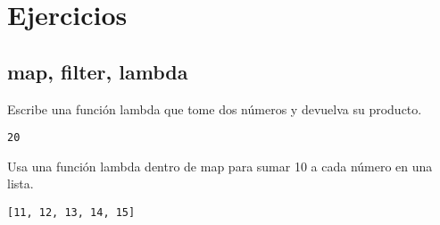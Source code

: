 \section{Ejercicios}

\subsection{map, filter, lambda}

\begin{exercise} 
Escribe una función lambda que tome dos números y devuelva su producto.
\begin{Shaded}
\begin{Highlighting}[]
\OperatorTok{=} \OperatorTok{*}
\NormalTok{, }\NormalTok{))}
\end{Highlighting}
\end{Shaded}

\begin{verbatim}
20

\end{verbatim}
\end{exercise}

\begin{exercise}
Usa una función lambda dentro de map para sumar 10 a cada número en una lista.
\begin{Shaded}
\begin{Highlighting}[]
\OperatorTok{=}\NormalTok{ [}\NormalTok{, }\NormalTok{, }\NormalTok{, }\NormalTok{, }\NormalTok{]}
\OperatorTok{=} \NormalTok{(}\NormalTok{(}\OperatorTok{+} 
\end{Highlighting}
\end{Shaded}

\begin{verbatim}
[11, 12, 13, 14, 15]

\end{verbatim}
\end{exercise}


